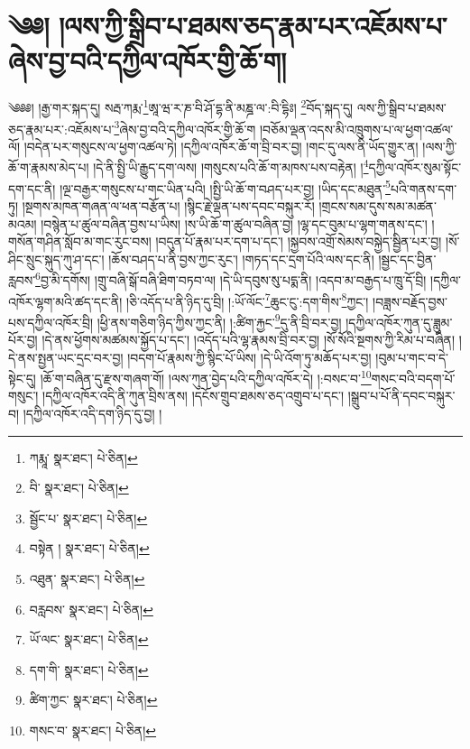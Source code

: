 \setcounter{footnote}{0} 
\chapter{༄༅། །ལས་ཀྱི་སྒྲིབ་པ་ཐམས་ཅད་རྣམ་པར་འཇོམས་པ་ཞེས་བྱ་བའི་དཀྱིལ་འཁོར་གྱི་ཆོ་ག།}༄༅༅། །རྒྱ་གར་སྐད་དུ། སརྦ་ཀརྨ་\footnote{ཀརྨཱ་  སྣར་ཐང་།  པེ་ཅིན། }ཨཱ་ཝ་ར་ཎ་བི་ཤོ་དྷ་ནི་མཎྜ་ལ་:བི་དྷིཿ། \footnote{བི་  སྣར་ཐང་།  པེ་ཅིན། }བོད་སྐད་དུ། ལས་ཀྱི་སྒྲིབ་པ་ཐམས་ཅད་རྣམ་པར་:འཇོམས་པ་\footnote{སྦྱོང་པ་  སྣར་ཐང་།  པེ་ཅིན། }ཞེས་བྱ་བའི་དཀྱིལ་འཁོར་གྱི་ཆོ་ག །བཅོམ་ལྡན་འདས་མི་འཁྲུགས་པ་ལ་ཕྱག་འཚལ་ལོ། །བདེན་པར་གསུངས་ལ་ཕྱག་འཚལ་ཏེ། །དཀྱིལ་འཁོར་ཆོ་ག་བྲི་བར་བྱ། །གང་དུ་ལས་ནི་ཡོད་གྱུར་ན། །ལས་ཀྱི་ཆོ་ག་རྣམས་མེད་པ། །དེ་ནི་སྤྱི་ཡི་རྒྱུད་དག་ལས། །གསུངས་པའི་ཆོ་ག་མཁས་པས་བརྟེན། །\footnote{བསྟེན །  སྣར་ཐང་།  པེ་ཅིན། }དཀྱིལ་འཁོར་སུམ་སྟོང་དག་དང་ནི། །ལྔ་བརྒྱར་གསུངས་པ་གང་ཡིན་པའི། །སྤྱི་ཡི་ཆོ་ག་བཤད་པར་བྱ། །ཡིད་དང་མཐུན་\footnote{འཐུན་  སྣར་ཐང་།  པེ་ཅིན། }པའི་གནས་དག་ཏུ། །སྔགས་མཁན་གཞན་ལ་ཕན་བརྩོན་པ། །སྙིང་རྗེ་ལྡན་པས་དབང་བསྐུར་རོ། །གྲངས་སམ་དུས་སམ་མཚན་མའམ། །བསྙེན་པ་ཚུལ་བཞིན་བྱས་པ་ཡིས། །ས་ཡི་ཆོ་ག་ཚུལ་བཞིན་བྱ། །ལྷ་དང་བུམ་པ་ལྷག་གནས་དང་། །གསོན་གཤིན་སློབ་མ་གང་རུང་བས། །བདུན་པོ་རྣམ་པར་དག་པ་དང་། །སྐྱབས་འགྲོ་སེམས་བསྐྱེད་སྦྱིན་པར་བྱ། །སོ་ཤིང་སྲུང་སྐུད་ཀུ་ཤ་དང་། །ཆོས་བཤད་པ་ནི་བྱས་ཀྱང་རུང་། །གཏད་དང་དྲག་པོའི་ལས་དང་ནི། །སྦྱང་དང་བྱིན་རླབས་\footnote{བརླབས་  སྣར་ཐང་།  པེ་ཅིན། }བྱ་མི་དགོས། །གྲུ་བཞི་སྒོ་བཞི་ཐིག་བཏབ་ལ། །དེ་ཡི་དབུས་སུ་པདྨ་ནི། །འདབ་མ་བརྒྱད་པ་ཁྲུ་དོ་བྲི། །དཀྱིལ་འཁོར་ལྷག་མའི་ཚད་དང་ནི། །ཅི་འདོད་པ་ནི་ཉིད་དུ་བྲི། །:ཡོ་ལོང་\footnote{ཡོ་ལང་  སྣར་ཐང་།  པེ་ཅིན། }ཆུང་ངུ་:དག་གིས་\footnote{དག་གི་  སྣར་ཐང་།  པེ་ཅིན། }ཀྱང་། །བཟླས་བརྗོད་བྱས་པས་དཀྱིལ་འཁོར་བྲི། །ཕྱི་ནས་གཅིག་ཉིད་ཀྱིས་ཀྱང་ནི། །:ཚིག་རྐྱང་\footnote{ཚིག་ཀྱང་  སྣར་ཐང་།  པེ་ཅིན། }དུ་ནི་བྲི་བར་བྱ། །དཀྱིལ་འཁོར་ཀུན་དུ་ཟླུམ་པོར་བྱ། །དེ་ནས་ཕྱོགས་མཚམས་སྐྱོད་པ་དང་། །འདོད་པའི་ལྷ་རྣམས་བྲི་བར་བྱ། །སོ་སོའི་སྔགས་ཀྱི་རིམ་པ་བཞིན། །དེ་ནས་སྤྱན་ཡང་དྲང་བར་བྱ། །བདག་པོ་རྣམས་ཀྱི་སྙིང་པོ་ཡིས། །དེ་ཡི་འོག་ཏུ་མཆོད་པར་བྱ། །བུམ་པ་གང་བ་དེ་སྟེང་དུ། །ཆོ་ག་བཞིན་དུ་རྫས་གཞག་གོ། །ལས་ཀུན་བྱེད་པའི་དཀྱིལ་འཁོར་དེ། །:བསང་བ་\footnote{གསང་བ་  སྣར་ཐང་།  པེ་ཅིན། }གསང་བའི་བདག་པོ་གསུང་། །དཀྱིལ་འཁོར་འདི་ནི་ཀུན་བྲིས་ནས། །དངོས་གྲུབ་ཐམས་ཅད་འགྲུབ་པ་དང་། །སྒྲུབ་པ་པོ་ནི་དབང་བསྐུར་བ། །དཀྱིལ་འཁོར་འདི་དག་ཉིད་དུ་བྱ། །
